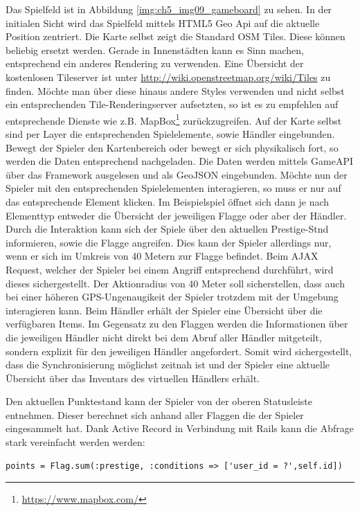 Das Spielfeld ist in Abbildung \ref{img:ch5_img09_gameboard} zu sehen. In der initialen Sicht wird das Spielfeld mittels HTML5 Geo Api auf die aktuelle Position zentriert. Die Karte selbst zeigt die Standard OSM Tiles. Diese können beliebig ersetzt werden. Gerade in Innenstädten kann es Sinn machen, entsprechend ein anderes Rendering zu verwenden. Eine Übersicht der kostenlosen Tileserver ist unter \url{http://wiki.openstreetmap.org/wiki/Tiles} zu finden. Möchte man über diese hinaus andere Styles verwenden und nicht selbst ein entsprechenden Tile-Renderingserver aufsetzten, so ist es zu empfehlen auf entsprechende Dienste wie z.B. MapBox\footnote{\url{https://www.mapbox.com/}} zurückzugreifen. Auf der Karte selbst sind per Layer die entsprechenden Spielelemente, sowie Händler eingebunden. Bewegt der Spieler den Kartenbereich oder bewegt er sich physikalisch fort, so werden die Daten entsprechend nachgeladen. Die Daten werden mittels GameAPI über das Framework ausgelesen und als GeoJSON eingebunden. Möchte nun der Spieler mit den entsprechenden Spielelementen interagieren, so muss er nur auf das entsprechende Element klicken. Im Beispielspiel öffnet sich dann je nach Elementtyp entweder die Übersicht der jeweiligen Flagge oder aber der Händler. Durch die Interaktion kann sich der Spiele über den aktuellen Prestige-Stnd informieren, sowie die Flagge angreifen. Dies kann der Spieler allerdings nur, wenn er sich im Umkreis von 40 Metern zur Flagge befindet. Beim AJAX Request, welcher der Spieler bei einem Angriff entsprechend durchführt, wird dieses sichergestellt. Der Aktionradius von 40 Meter soll sicherstellen, dass auch bei einer höheren GPS-Ungenaugikeit der Spieler trotzdem mit der Umgebung interagieren kann.
Beim Händler erhält der Spieler eine Übersicht über die verfügbaren Items. Im Gegensatz zu den Flaggen werden die Informationen über die jeweiligen Händler nicht direkt bei dem Abruf aller Händler mitgeteilt, sondern explizit für den jeweiligen Händler angefordert. Somit wird sichergestellt, dass die Synchronisierung möglichst zeitnah ist und der Spieler eine aktuelle Übersicht über das Inventars des virtuellen Händlers erhält.

Den aktuellen Punktestand kann der Spieler von der oberen Statusleiste entnehmen. Dieser berechnet sich anhand aller Flaggen die der Spieler eingesammelt hat. Dank Active Record in Verbindung mit Rails kann die Abfrage stark vereinfacht werden werden:
\\
\lstset{
   language=Ruby
}

\begin{lstlisting}[caption=Ruby - Abfrage der Spielerpunkte, label=code:ch5:activerecord01]
points = Flag.sum(:prestige, :conditions => ['user_id = ?',self.id])
\end{lstlisting}

